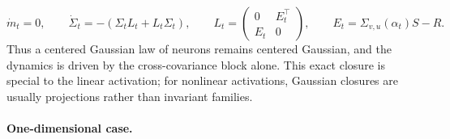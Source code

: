 \begin{example}
	\[
		\dot m_t=0,
		\qquad
		\dot\Sigma_t=-(\Sigma_t L_t+L_t\Sigma_t),
		\qquad
		L_t=
		\begin{pmatrix}
			0 & E_t^\top\\
			E_t & 0
		\end{pmatrix},
		\qquad
		E_t=\Sigma_{v,u}(\alpha_t)S-R.
	\]
	Thus a centered Gaussian law of neurons remains centered Gaussian, and the dynamics is driven by the cross-covariance block alone. This exact closure is special to the linear activation; for nonlinear activations, Gaussian closures are usually projections rather than invariant families.
\end{example}

\paragraph{One-dimensional case.}

